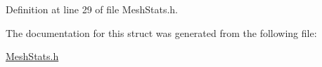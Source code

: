 Definition at line 29 of file Mesh\+Stats.\+h.



The documentation for this struct was generated from the following file\+:\begin{DoxyCompactItemize}
\item 
\hyperlink{_mesh_stats_8h}{Mesh\+Stats.\+h}\end{DoxyCompactItemize}
